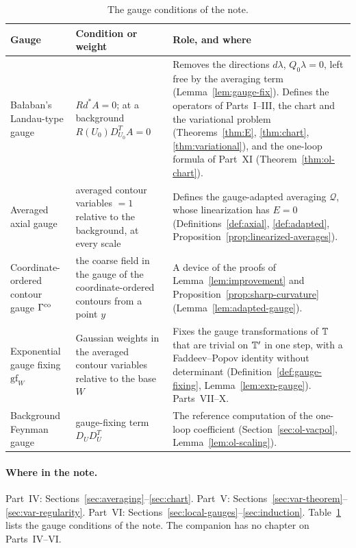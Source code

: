 \begin{table}[htbp]
\centering\small
\renewcommand{\arraystretch}{1.15}
\begin{tabular}{@{}p{}p{}p{}@{}}
\hline
\raggedright Gauge & \raggedright Condition or weight & \raggedright Role, and where \tabularnewline
\hline
\raggedright Ba\l aban's Landau-type gauge & \raggedright $Rd^*A=0$; at a background $R(U_0)D_{U_0}^TA=0$ & \raggedright Removes the directions $d\lambda$, $Q_0\lambda=0$, left free by the averaging term (Lemma~\ref{lem:gauge-fix}). Defines the operators of Parts~I--III, the chart and the variational problem (Theorems~\ref{thm:E}, \ref{thm:chart}, \ref{thm:variational}), and the one-loop formula of Part~XI (Theorem~\ref{thm:ol-chart}). \tabularnewline
\raggedright Averaged axial gauge & \raggedright averaged contour variables $=1$ relative to the background, at every scale & \raggedright Defines the gauge-adapted averaging $\mathcal Q$, whose linearization has $E=0$ (Definitions~\ref{def:axial}, \ref{def:adapted}, Proposition~\ref{prop:linearized-averages}). \tabularnewline
\raggedright Coordinate-ordered contour gauge $\Gamma^{\rm co}$ & \raggedright the coarse field in the gauge of the coordinate-ordered contours from a point $y$ & \raggedright A device of the proofs of Lemma~\ref{lem:improvement} and Proposition~\ref{prop:sharp-curvature} (Lemma~\ref{lem:adapted-gauge}). \tabularnewline
\raggedright Exponential gauge fixing $\mathrm{gf}_W$ & \raggedright Gaussian weights in the averaged contour variables relative to the base $W$ & \raggedright Fixes the gauge transformations of $\mathbb T$ that are trivial on $\mathbb T'$ in one step, with a Faddeev--Popov identity without determinant (Definition~\ref{def:gauge-fixing}, Lemma~\ref{lem:exp-gauge}). Parts~VII--X. \tabularnewline
\raggedright Background Feynman gauge & \raggedright gauge-fixing term $D_UD_U^T$ & \raggedright The reference computation of the one-loop coefficient (Section~\ref{sec:ol-vacpol}, Lemma~\ref{lem:ol-scaling}). \tabularnewline
\hline
\end{tabular}
\caption{The gauge conditions of the note.}\label{tab:G-gauges}
\end{table}

\paragraph{Where in the note.} Part~IV: Sections~\ref{sec:averaging}--\ref{sec:chart}. Part~V: Sections~\ref{sec:var-theorem}--\ref{sec:var-regularity}. Part~VI: Sections~\ref{sec:local-gauges}--\ref{sec:induction}. Table~\ref{tab:G-gauges} lists the gauge conditions of the note. The companion has no chapter on Parts~IV--VI.

